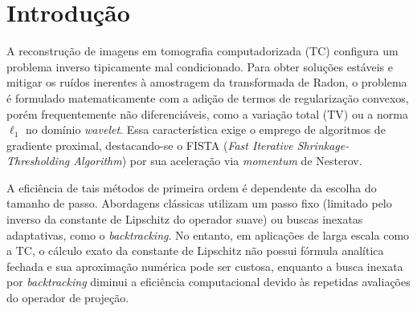 \documentclass[12pt]{article}
\begin{document}
\setcounter{page}{2}
\newpage
\tableofcontents
\vspace{1cm} 

\begin{abstract}
Neste trabalho investigou-se o impacto da busca linear exata em métodos de otimização suave e de gradiente proximal (ISTA/FISTA) para reconstrução de imagens. Em problemas quadráticos, a busca exata acelera a convergência de métodos como o Nesterov, mas em problemas regularizados com termos não suaves (norma $\ell_1$ no domínio \textit{wavelet} e regularização por variação total) os passos calculados ignoram a geometria do termo de regularização, causando instabilidade assintótica. Observou-se, porém, um fenômeno consistente de semi-convergência, onde o FISTA com o passo exato atinge rapidamente uma alta qualidade de reconstrução. Os resultados sugerem que estratégias híbridas de otimização podem ser promissoras.
\end{abstract}

\section{Introdução}

A reconstrução de imagens em tomografia computadorizada (TC) configura um problema inverso tipicamente mal condicionado. Para obter soluções estáveis e mitigar os ruídos inerentes à amostragem da transformada de Radon, o problema é formulado matematicamente com a adição de termos de regularização convexos, porém frequentemente não diferenciáveis, como a variação total (TV) ou a norma $\ell_1$ no domínio \textit{wavelet}. Essa característica exige o emprego de algoritmos de gradiente proximal, destacando-se o FISTA (\textit{Fast Iterative Shrinkage-Thresholding Algorithm}) por sua aceleração via \textit{momentum} de Nesterov.

A eficiência de tais métodos de primeira ordem é dependente da escolha do tamanho de passo. Abordagens clássicas utilizam um passo fixo (limitado pelo inverso da constante de Lipschitz do operador suave) ou buscas inexatas adaptativas, como o \textit{backtracking}. No entanto, em aplicações de larga escala como a TC, o cálculo exato da constante de Lipschitz não possui fórmula analítica fechada e sua aproximação numérica pode ser custosa, enquanto a busca inexata por \textit{backtracking} diminui a eficiência computacional devido às repetidas avaliações do operador de projeção.
\end{document}
